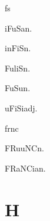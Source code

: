 \begin{multicols*}{2}
\begin{dictroot}{f}{s}
\begin{dictentry}{iFuSa}{n.}
{        }
    \end{dictentry}
    \begin{dictentry}{inFiS}{n.}
    \end{dictentry}
    \begin{dictentry}{FuliS}{n.}
    \end{dictentry}
    \begin{dictentry}{FuSu}{n.}
    \end{dictentry}
    \begin{dictentry}{uFiSi}{adj.}
    \end{dictentry}
\end{dictroot}

\begin{dictroot}{fr}{nc}
    \begin{dictentry}{FRuuNC}{n.}
    \end{dictentry}
    \begin{dictentry}{FRaNCia}{n.}
    \end{dictentry}
\end{dictroot}

\section*{H}


\end{multicols*}
